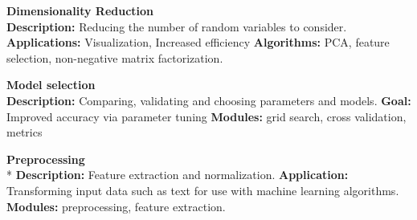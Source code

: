  
  
\textbf{Dimensionality Reduction}\\

 
  \textbf{Description: } Reducing the number of random variables to consider.
 \textbf{Applications:} Visualization, Increased efficiency
 \textbf{Algorithms:} PCA, feature selection, non-negative matrix factorization. 
 
 
 
 
\textbf{Model selection}\\
 
  \textbf{Description: } Comparing, validating and choosing parameters and models.
 \textbf{Goal:} Improved accuracy via parameter tuning
 \textbf{Modules:} grid search, cross validation, metrics
 
 
 
 
\textbf{Preprocessing}\\
* \textbf{Description:} Feature extraction and normalization.
 \textbf{Application:} Transforming input data such as text for use with machine learning algorithms.
 \textbf{Modules:} preprocessing, feature extraction.
 
 

